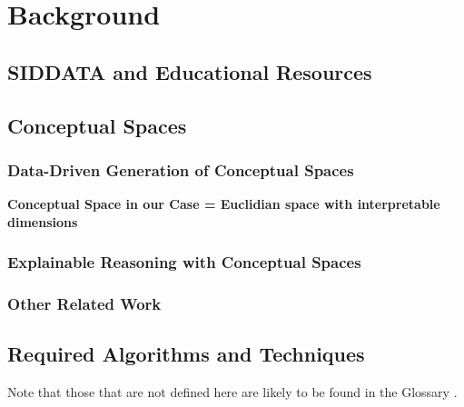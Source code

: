 \chapter{Background}


\section{SIDDATA and Educational Resources}


\section{Conceptual Spaces}


\subsection{Data-Driven Generation of Conceptual Spaces}


\textbf{Conceptual Space in our Case = Euclidian space with interpretable dimensions}

\subsection{Explainable Reasoning with Conceptual Spaces}
\label{sec:reasoning}

\subsection{Other Related Work}
\label{sec:otherwork}



\section{Required Algorithms and Techniques}

Note that those that are not defined here are likely to be found in the Glossary .

